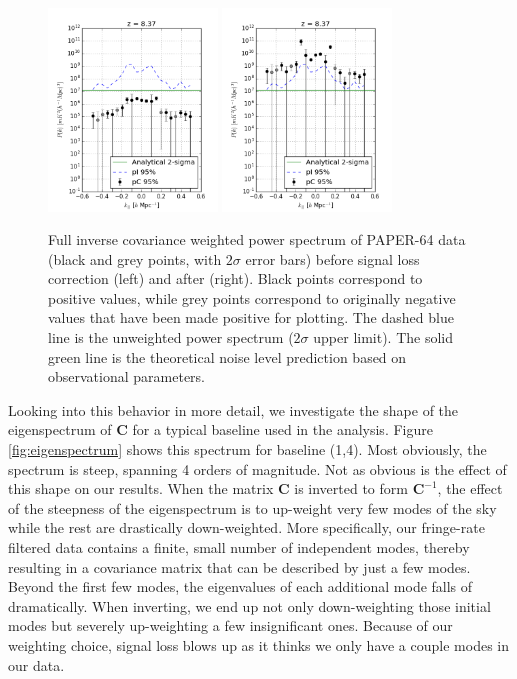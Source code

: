 \documentclass[preprint2,numberedappendix,tighten,twocolappendix]{aastex6}  %
\begin{document}
\begin{figure}
	\centering
	\includegraphics[width=0.4\textwidth]{ps2_data_nosigloss.png}
	\includegraphics[width=0.4\textwidth]{ps2_data.png}
	\caption{Full inverse covariance weighted power spectrum of PAPER-64 data (black and grey points, with $2\sigma$ error bars) before signal loss correction (left) and after (right). Black points correspond to positive values, while grey points correspond to originally negative values that have been made positive for plotting. The dashed blue line is the unweighted power spectrum ($2\sigma$ upper limit). The solid green line is the theoretical noise level prediction based on observational parameters.}
	\label{fig:ps2_data}
\end{figure}

Looking into this behavior in more detail, we investigate the shape of the eigenspectrum of $\textbf{C}$ for a typical baseline used in the analysis. Figure \ref{fig:eigenspectrum} shows this spectrum for baseline (1,4). Most obviously, the spectrum is steep, spanning 4 orders of magnitude. Not as obvious is the effect of this shape on our results. When the matrix $\textbf{C}$ is inverted to form $\textbf{C}^{-1}$, the effect of the steepness of the eigenspectrum is to up-weight very few modes of the sky while the rest are drastically down-weighted. More specifically, our fringe-rate filtered data contains a finite, small number of independent modes, thereby resulting in a covariance matrix that can be described by just a few modes. Beyond the first few modes, the eigenvalues of each additional mode falls of dramatically. When inverting, we end up not only down-weighting those initial modes but severely up-weighting a few insignificant ones. Because of our weighting choice, signal loss blows up as it thinks we only have a couple modes in our data.
\end{document}
